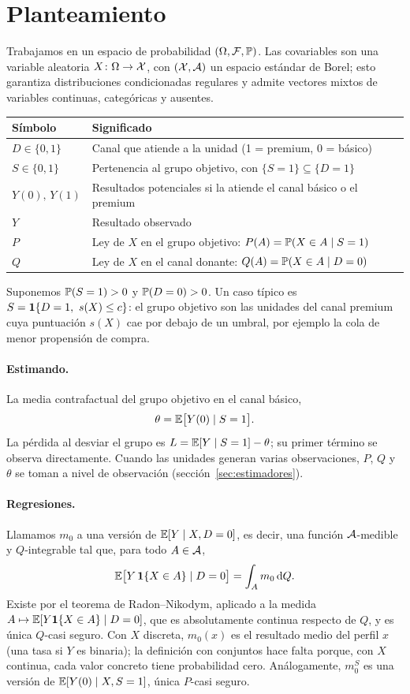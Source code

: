 \section{Planteamiento}\label{sec:planteamiento}

Trabajamos en un espacio de probabilidad $(\Omega,\mathcal F,\mathbb{P})$. Las covariables son una variable aleatoria $X\colon\Omega\to\mathcal{X}$, con $(\mathcal{X},\mathcal{A})$ un espacio estándar de Borel; esto garantiza distribuciones condicionadas regulares y admite vectores mixtos de variables continuas, categóricas y ausentes.

\begin{center}
\begin{tabular}{@{}ll@{}}
\toprule
Símbolo & Significado \\
\midrule
$D\in\{0,1\}$ & Canal que atiende a la unidad (1 = premium, 0 = básico) \\
$S\in\{0,1\}$ & Pertenencia al grupo objetivo, con $\{S=1\}\subseteq\{D=1\}$ \\
$Y(0),\,Y(1)$ & Resultados potenciales si la atiende el canal básico o el premium \\
$Y$ & Resultado observado \\
$P$ & Ley de $X$ en el grupo objetivo: $P(A)=\mathbb{P}(X\in A\mid S=1)$ \\
$Q$ & Ley de $X$ en el canal donante: $Q(A)=\mathbb{P}(X\in A\mid D=0)$ \\
\bottomrule
\end{tabular}
\end{center}

Suponemos $\mathbb{P}(S=1)>0$ y $\mathbb{P}(D=0)>0$. Un caso típico es $S=\mathbf{1}\{D=1,\ s(X)\le c\}$: el grupo objetivo son las unidades del canal premium cuya puntuación $s(X)$ cae por debajo de un umbral, por ejemplo la cola de menor propensión de compra.

\paragraph{Estimando.} La media contrafactual del grupo objetivo en el canal básico,
\[
\theta=\mathbb{E}\bigl[Y(0)\mid S=1\bigr].
\]
La pérdida al desviar el grupo es $L=\mathbb{E}[Y\mid S=1]-\theta$; su primer término se observa directamente. Cuando las unidades generan varias observaciones, $P$, $Q$ y $\theta$ se toman a nivel de observación (sección~\ref{sec:estimadores}).

\paragraph{Regresiones.} Llamamos $m_0$ a una versión de $\mathbb{E}[Y\mid X,D=0]$, es decir, una función $\mathcal{A}$-medible y $Q$-integrable tal que, para todo $A\in\mathcal{A}$,
\[
\mathbb{E}\bigl[Y\,\mathbf{1}\{X\in A\}\mid D=0\bigr]=\int_A m_0\,\mathrm{d} Q .
\]
Existe por el teorema de Radon--Nikodym, aplicado a la medida $A\mapsto\mathbb{E}[Y\mathbf{1}\{X\in A\}\mid D=0]$, que es absolutamente continua respecto de $Q$, y es única $Q$-casi seguro. Con $X$ discreta, $m_0(x)$ es el resultado medio del perfil $x$ (una tasa si $Y$ es binaria); la definición con conjuntos hace falta porque, con $X$ continua, cada valor concreto tiene probabilidad cero. Análogamente, $m_0^S$ es una versión de $\mathbb{E}[Y(0)\mid X,S=1]$, única $P$-casi seguro.

